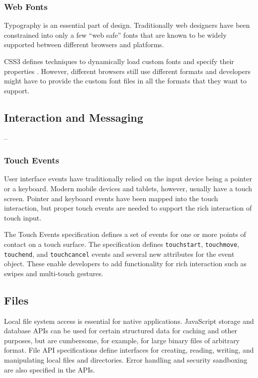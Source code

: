\subsubsection{Web Fonts}

Typography is an essential part of design. Traditionally web designers
have been constrained into only a few ``web safe'' fonts that are
known to be widely supported between different browsers and platforms.

CSS3 defines techniques to dynamically load custom fonts and specify
their properties \cite{cssfonts}. However, different browsers still
use different formats and developers might have to provide the custom
font files in all the formats that they want to support.

\subsection{Interaction and Messaging}

--

\subsubsection{Touch Events}

User interface events have traditionally relied on the input device
being a pointer or a keyboard. Modern mobile devices and tablets,
however, usually have a touch screen. Pointer and keyboard events have
been mapped into the touch interaction, but proper touch events are
needed to support the rich interaction of touch input.

The Touch Events specification \cite{touchevents} defines a set of
events for one or more points of contact on a touch surface. The
specification defines \texttt{touchstart}, \texttt{touchmove},
\texttt{touchend}, and \texttt{touchcancel} events and several new
attributes for the event object. These enable developers to add
functionality for rich interaction such as swipes and multi-touch
gestures.

\subsection{Files}
\label{section:fileapi}

Local file system access is essential for native
applications. JavaScript storage and database APIs can be used for
certain structured data for caching and other purposes, but are
cumbersome, for example, for large binary files of arbitrary
format. File API specifications \cite{FileAPI, FileAPIWriter,
  FileAPIDir} define interfaces for creating, reading, writing, and
manipulating local files and directories. Error handling and security
sandboxing are also specified in the APIs.

